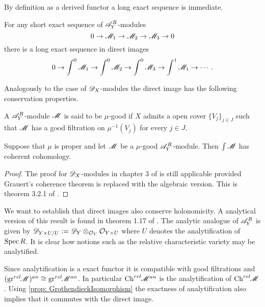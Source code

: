     By definition as a derived functor a long exact sequence is immediate.
    \begin{proposition}
        For any short exact sequence of $\mathscr{A}_Y^R$-modules
        $$0\to \mathscr{M}_1 \to \mathscr{M}_2 \to \mathscr{M}_3 \to 0$$
        there is a long exact sequence in direct images
        $$0\to \int^0 \mathscr{M}_1 \to \int^0 \mathscr{M}_2 \to \int^0 \mathscr{M}_3 \to \int^1 \mathscr{M}_1 \to \cdots. $$
    \end{proposition}
    Analogously to the case of $\mathscr{D}_X$-modules the direct image has the following conservation properties.
  \begin{definition}
      A $\mathscr{A}_Y^R$-module $\mathscr{M}$ is said to be $\mu$-good if $X$ admits a open cover $\{V_j\}_{j\in J}$ such that $\mathscr{M}$ has a good filtration on $\mu^{-1}(V_j)$ for every $j\in J$.
  \end{definition}
  \begin{theorem}
      Suppose that $\mu$ is proper and let $\mathscr{M}$ be a $\mu$-good $\mathscr{A}_Y^R$-module. Then $\int \mathscr{M}$ has coherent cohomology.
  \end{theorem}
  \begin{proof}
    The proof for $\mathscr{D}_X$-modules in chapter 3 of \cite{sabbah2011introduction} is still applicable provided Grauert's coherence theorem is replaced with the algebraic version. This is theorem 3.2.1 of \cite{EGAIII}.
  \end{proof}
  We want to establish that direct images also conserve holonomicity.
  A analytical version of this result is found in theorem 1.17 of \cite{monteiro2016riemann}.
  The analytic analogue of $\mathscr{A}_{Y}^R$ is given by $\mathscr{D}_{Y\times U/U}:= \mathscr{D}_Y\otimes_{\mathcal{O}_Y}\mathcal{O}_{Y\times U}$ where $U$ denotes the analytification of $\operatorname{Spec} R$.
  It is clear how notions such as the relative characteristic variety may be analytified.

  Since analytification is a exact functor it is compatible with good filtrations and $(\operatorname{gr}^{rel}\mkern-5mu\mathscr{M})^{an} \cong \operatorname{gr}^{rel}\mkern-5mu \mathscr{M}^{an}$.
  In particular $\operatorname{Ch}^{rel}\mkern-5mu \mathscr{M}^{an}$ is the analytification of $\operatorname{Ch}^{rel}\mkern-5mu\mathscr{M}$.
  Using \cref{prop: GrothendieckIsomorphism} the exactness of analytification also implies that it commutes with the direct image.

